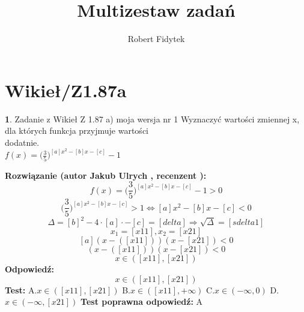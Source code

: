 \documentclass[12pt, a4paper]{article}
\title{Multizestaw zadań}
\author{Robert Fidytek}
\date{}
\theoremstyle{definition} %
\newtheorem{zad}{}
\newcommand{\kategoria}[1]{\section{#1}} %
\newcommand{\zadStart}[1]{\begin{zad}#1\newline} %
\newcommand{\zadStop}{\end{zad}}   %
\newcommand{\rozwStart}[2]{\noindent \textbf{Rozwiązanie (autor #1 , recenzent #2): }\newline} %
\newcommand{\rozwStop}{\newline}                                            %
\newcommand{\odpStart}{\noindent \textbf{Odpowiedź:}\newline}    %
\newcommand{\odpStop}{\newline}                                             %
\newcommand{\testStart}{\noindent \textbf{Test:}\newline} %
\newcommand{\testStop}{\newline} %
\newcommand{\kluczStart}{\noindent \textbf{Test poprawna odpowiedź:}\newline} %
\newcommand{\kluczStop}{\newline} %
\begin{document}
\maketitle


\kategoria{Wikieł/Z1.87a}
\zadStart{Zadanie z Wikieł Z 1.87 a) moja wersja nr 1}
Wyznaczyć wartości zmiennej x, dla których funkcja przyjmuje wartości\\ dodatnie.\\ $f(x)=\big(\frac{3}{5}\big)^{[a]x^{2}-[b]x-[c]}-1$
\zadStop
\rozwStart{Jakub Ulrych}{}
$$f(x)=\big(\frac{3}{5}\big)^{[a]x^{2}-[b]x-[c]}-1>0$$
$$\big(\frac{3}{5}\big)^{[a]x^{2}-[b]x-[c]}>1\Leftrightarrow [a]x^{2}-[b]x-[c]<0$$
$$\Delta=[b]^{2}-4\cdot[a]\cdot-[c]=[delta]\Rightarrow \sqrt{\Delta}=[sdelta1]$$
$$x_{1}=[x11],x_{2}=[x21]$$
$$[a](x-([x11]))(x-[x21])<0$$
$$(x-([x11]))(x-[x21])<0$$
$$x\in([x11],[x21])$$
\rozwStop
\odpStart
$$x\in([x11],[x21])$$
\odpStop
\testStart
A.$x\in([x11],[x21])$
B.$x\in([x11],+\infty)$
C.$x\in(-\infty,0)$
D.$x\in(-\infty,[x21])$
\testStop
\kluczStart
A
\kluczStop
\end{document}
